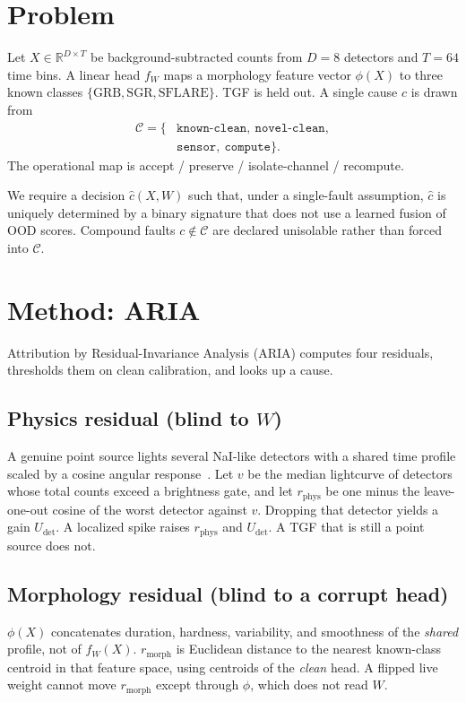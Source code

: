 \documentclass{ieeeaccess}
\begin{document}
\section{Problem}

Let $X\in\mathbb{R}^{D\times T}$ be background-subtracted counts from $D=8$ detectors and $T=64$ time bins. A linear head $f_W$ maps a morphology feature vector $\phi(X)$ to three known classes $\{\mathrm{GRB},\mathrm{SGR},\mathrm{SFLARE}\}$. TGF is held out. A single cause $c$ is drawn from
\begin{align*}
\mathcal{C}=\{&\texttt{known-clean},\ \texttt{novel-clean},\\
&\texttt{sensor},\ \texttt{compute}\}.
\end{align*}
The operational map is accept / preserve / isolate-channel / recompute.

We require a decision $\hat{c}(X,W)$ such that, under a single-fault assumption, $\hat{c}$ is uniquely determined by a binary signature that does not use a learned fusion of OOD scores. Compound faults $c\notin\mathcal{C}$ are declared unisolable rather than forced into $\mathcal{C}$.

\section{Method: ARIA}

Attribution by Residual-Invariance Analysis (ARIA) computes four residuals, thresholds them on clean calibration, and looks up a cause.

\subsection{Physics residual (blind to $W$)}
A genuine point source lights several NaI-like detectors with a shared time profile scaled by a cosine angular response~\cite{meegan2009}. Let $v$ be the median lightcurve of detectors whose total counts exceed a brightness gate, and let $r_{\mathrm{phys}}$ be one minus the leave-one-out cosine of the worst detector against $v$. Dropping that detector yields a gain $U_{\mathrm{det}}$. A localized spike raises $r_{\mathrm{phys}}$ and $U_{\mathrm{det}}$. A TGF that is still a point source does not.

\subsection{Morphology residual (blind to a corrupt head)}
$\phi(X)$ concatenates duration, hardness, variability, and smoothness of the \emph{shared} profile, not of $f_W(X)$. $r_{\mathrm{morph}}$ is Euclidean distance to the nearest known-class centroid in that feature space, using centroids of the \emph{clean} head. A flipped live weight cannot move $r_{\mathrm{morph}}$ except through $\phi$, which does not read $W$.
\end{document}
